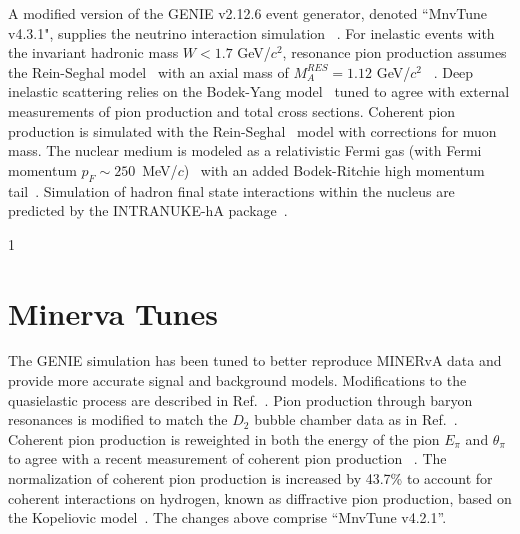 \documentclass[aps,preprint,showpacs,superscriptaddress,letterpaper,showkeys,superscriptaddress,nofootinbib,floatfix]{revtex4-1}
\newcommand{\firstReviewAdd}[1]{{\bf\color{blue} \protect #1}}
\newcommand{\firstReviewStrike}[1]{{\bf\color{blue}\protect \sout{#1}}}
\newcommand{\secondReviewAdd}[1]{{\bf\color{purple} \protect #1}}
\newcommand{\firstRefereeAdd}[1]{{\bf\color{green} \protect #1}}
\newcommand{\firstRefereeStrike}[1]{{\bf\color{green}\protect \sout{#1}}}
\newcommand{\showSections}[0]{0}
\renewcommand{\firstReviewAdd}[1]{\protect #1}
\renewcommand{\firstReviewStrike}[1]{}
\renewcommand{\secondReviewAdd}[1]{\protect #1}
\renewcommand{\firstRefereeAdd}[1]{\protect #1}
\renewcommand{\firstRefereeStrike}[1]{}
\begin{document}
A modified version of the GENIE v2.12.6 event generator, \firstRefereeAdd{denoted ``MnvTune v4.3.1",} supplies the \firstRefereeAdd{neutrino interaction} simulation \firstRefereeStrike{of the signal and background neutrino interactions}~\cite{Andreopoulos:2009rq}. 
For inelastic events with the invariant hadronic mass $W<1.7$ GeV/$c^2$, resonance pion production \firstReviewStrike{uses} \firstReviewAdd{assumes the} Rein-Seghal model~\cite{Rein:1980wg} with an axial mass of $M_{A}^{RES} = 1.12$ GeV/$c^2$~
\firstReviewAdd{\cite{Kuzmin:2006dh}}.  Deep inelastic scattering \firstRefereeStrike{(DIS)} relies on the Bodek-Yang model~\cite{Bodek:2004pc} tuned to agree with external measurements of pion production and total cross sections.  Coherent pion production is simulated with the Rein-Seghal~\cite{Rein:1982pf,Rein:2006di} model with corrections for \firstReviewStrike{non-zero} muon mass.  The nuclear medium is modeled as a relativistic Fermi gas (\firstReviewAdd{with Fermi momentum} $p_F\sim 250$~MeV/$c$)~\cite{Moniz:1971mt} with an added Bodek-Ritchie high momentum tail~\cite{Bodek:1980ar,Bodek:1981wr}.  Simulation of hadron final state interactions within the nucleus are predicted by the INTRANUKE-hA package~\cite{Andreopoulos:2009rq}.

\if\showSections1 \section{Minerva Tunes} \fi

The GENIE simulation has been tuned \firstRefereeStrike{in order} to better reproduce MINERvA data and provide more accurate signal and background models\firstRefereeStrike{ resulting in a model known as ``MnvTune v4.3.1"}.  Modifications to the quasielastic process are described in Ref.~\cite{Carneiro:2019jds,Rodrigues:2015hik}. \secondReviewAdd{Pion production through baryon resonances is modified to match the $D_2$ bubble chamber data as in Ref.~\cite{Rodrigues:2016xjj}.}   Coherent pion production is reweighted in both the energy of the pion $E_\pi$ and $\theta_\pi$ to agree with a recent measurement of coherent pion production \firstRefereeStrike{in the medium energy NuMI beam}~\cite{AlexCoherent}.  \firstRefereeStrike{Additionally,} The normalization of coherent pion production is increased by 43.7\% \firstRefereeStrike{in order} to account for coherent interactions on hydrogen\firstRefereeAdd{,} known as diffractive pion production, based on the Kopeliovic  model~\cite{Kopeliovich:2012tu}.  \secondReviewAdd{The changes above comprise ``MnvTune v4.2.1''.}
\end{document}
